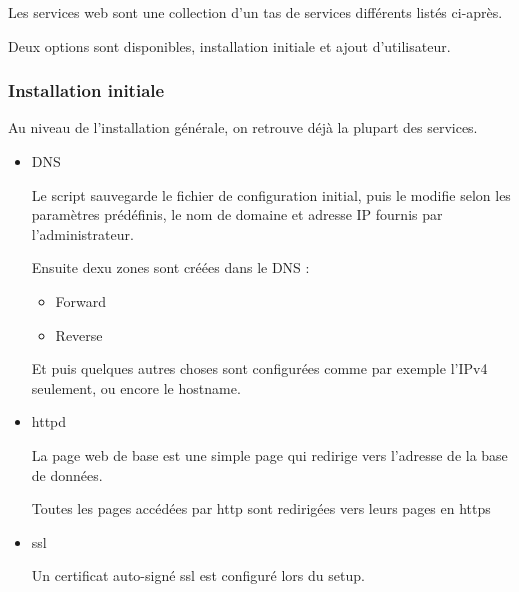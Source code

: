 \documentclass{article}
\begin{document}
Les services web sont une collection d'un tas de services différents listés ci-après.

Deux options sont disponibles, installation initiale et ajout d'utilisateur.

\subsubsection{Installation initiale}

Au niveau de l'installation générale, on retrouve déjà la plupart des services.

\begin{itemize}
\item DNS

Le script sauvegarde le fichier de configuration initial, puis le modifie selon les paramètres prédéfinis, le nom de domaine et adresse IP fournis par l'administrateur.



Ensuite dexu zones sont créées dans le DNS :

\begin{itemize}
\item Forward 

\item Reverse 
\end{itemize}

Et puis quelques autres choses sont configurées comme par exemple l'IPv4 seulement, ou encore le hostname.


\item httpd

La page web de base est une simple page qui redirige vers l'adresse de la base de données.

Toutes les pages accédées par http sont redirigées vers leurs pages en https

\item ssl

Un certificat auto-signé ssl est configuré lors du setup.


\end{itemize}
\end{document}
